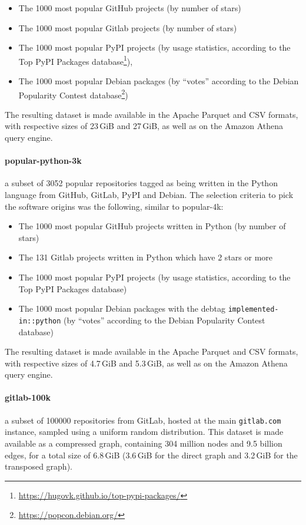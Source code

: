 \begin{itemize}
    \setlength\itemsep{0em}
    \item The 1000 most popular GitHub projects (by number of stars)
    \item The 1000 most popular Gitlab projects (by number of stars)
    \item The 1000 most popular PyPI projects (by usage statistics, according
        to the Top PyPI Packages
        database\footnote{\url{https://hugovk.github.io/top-pypi-packages/}}),
    \item The 1000 most popular Debian packages (by “votes” according to the
        Debian Popularity Contest
        database\footnote{\url{https://popcon.debian.org/}})
\end{itemize}

The resulting dataset is made available in the Apache Parquet and CSV formats,
with respective sizes of 23\,GiB and 27\,GiB, as well as on the Amazon Athena
query engine.

\paragraph{popular-python-3k} a subset of 3052 popular repositories tagged as
being written in the Python language from GitHub, GitLab, PyPI and Debian. The
selection criteria to pick the software origins was the following, similar to
popular-4k:

\begin{itemize}
    \setlength\itemsep{0em}
    \item The 1000 most popular GitHub projects written in Python (by number of
        stars)
    \item The 131 Gitlab projects written in Python which have 2 stars or more
    \item The 1000 most popular PyPI projects (by usage statistics, according
        to the Top PyPI Packages database)
    \item The 1000 most popular Debian packages with the debtag
        \texttt{implemented-in::python} (by “votes” according to the Debian
        Popularity Contest database)
\end{itemize}

The resulting dataset is made available in the Apache Parquet and CSV formats,
with respective sizes of 4.7\,GiB and 5.3\,GiB, as well as on the Amazon Athena
query engine.

\paragraph{gitlab-100k} a subset of \num{100000} repositories from GitLab,
hosted at the main \texttt{gitlab.com} instance, sampled using a uniform random
distribution. This dataset is made available as a compressed graph, containing
304 million nodes and 9.5 billion edges, for a total size of 6.8\,GiB (3.6\,GiB
for the direct graph and 3.2\,GiB for the transposed graph).

